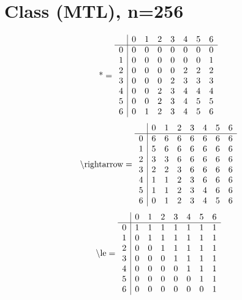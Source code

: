 \documentclass[11pt]{article}
\begin{document}
\section{Class (MTL), n=256}
\[\text{*} = 
\begin{array}{r | r r r r r r r}
 & 0 & 1 & 2 & 3 & 4 & 5 & 6 \\ \hline
0 & 0 & 0 & 0 & 0 & 0 & 0 & 0 \\
1 & 0 & 0 & 0 & 0 & 0 & 0 & 1 \\
2 & 0 & 0 & 0 & 0 & 2 & 2 & 2 \\
3 & 0 & 0 & 0 & 2 & 3 & 3 & 3 \\
4 & 0 & 0 & 2 & 3 & 4 & 4 & 4 \\
5 & 0 & 0 & 2 & 3 & 4 & 5 & 5 \\
6 & 0 & 1 & 2 & 3 & 4 & 5 & 6 \\
\end{array}
\]
\[\text{\textbackslash rightarrow} = 
\begin{array}{r | r r r r r r r}
 & 0 & 1 & 2 & 3 & 4 & 5 & 6 \\ \hline
0 & 6 & 6 & 6 & 6 & 6 & 6 & 6 \\
1 & 5 & 6 & 6 & 6 & 6 & 6 & 6 \\
2 & 3 & 3 & 6 & 6 & 6 & 6 & 6 \\
3 & 2 & 2 & 3 & 6 & 6 & 6 & 6 \\
4 & 1 & 1 & 2 & 3 & 6 & 6 & 6 \\
5 & 1 & 1 & 2 & 3 & 4 & 6 & 6 \\
6 & 0 & 1 & 2 & 3 & 4 & 5 & 6 \\
\end{array}
\]
\[\text{\textbackslash le} = 
\begin{array}{r | r r r r r r r}
 & 0 & 1 & 2 & 3 & 4 & 5 & 6 \\ \hline
0 & 1 & 1 & 1 & 1 & 1 & 1 & 1 \\
1 & 0 & 1 & 1 & 1 & 1 & 1 & 1 \\
2 & 0 & 0 & 1 & 1 & 1 & 1 & 1 \\
3 & 0 & 0 & 0 & 1 & 1 & 1 & 1 \\
4 & 0 & 0 & 0 & 0 & 1 & 1 & 1 \\
5 & 0 & 0 & 0 & 0 & 0 & 1 & 1 \\
6 & 0 & 0 & 0 & 0 & 0 & 0 & 1 \\
\end{array}
\]
\end{document}
